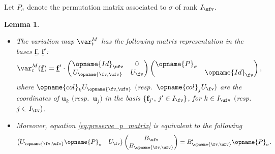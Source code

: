\documentclass[pdftex]{sigma}
\newcommand{\Iufv}{I_{\ufv}}
\newcommand{\Ifv}{I_{\fv}}
\newcommand{\Id}{{\opname{Id}}}
\newcommand{\col}{\opname{col}}
\newcommand{\trans}{\opname{P}}
\newcommand{\ff}{\mathbf{f}}
\renewcommand{\uu}{\mathbf{u}}
\newcommand{\uff}{\underline{\ff}}
\newcommand{\low}{\opname{\fv,\ufv}}
\numberwithin{equation}{section}
\newtheorem{Lemma}[Theorem]{Lemma}
\begin{document}
Let $P_{\sigma}$ denote the permutation matrix associated to $\sigma$
of rank $\Iufv$.

\begin{Lemma}\label{lem:matrix_eq_A_variation}\quad
\begin{itemize}\itemsep=0pt
\item[$(1)$] The variation map $\var_{t}^{M}$ has the following matrix representation
in the bases $\uff$, $\uff'$:
\begin{align*}%
\var_{t}^{M}(\uff) & =\uff'\cdot\begin{pmatrix}
\Id_{\ufv} & 0\\
U_{\low} & U_{\fv}
\end{pmatrix}\begin{pmatrix}
\trans_{\sigma}\\
 & \Id_{\fv}
\end{pmatrix},
\end{align*}
where $\col_{k}U_{\low}$ $($resp.\ $\col_{j}U_{\fv})$ are the coordinates of $\uu_{k}$ $($resp.\ $\uu_{j})$ in the basis $\{\ff_{j'},\,j'\in\Ifv\}$, for $k\in \Iufv $
$($resp.\ $j\in I_{\fv})$.

\item[$(2)$] Moreover, equation \eqref{eq:preserve_p_matrix} is equivalent
to the following
\begin{gather}
\begin{pmatrix}
U_{\low}\trans_{\sigma} & U_{\fv}\end{pmatrix}\begin{pmatrix}
B_{\ufv}\\
B_{\low}
\end{pmatrix} = B'_{\low}\trans_{\sigma}.\label{eq:solve_cluster_A_twist}
\end{gather}
\end{itemize}
\end{Lemma}
\end{document}
